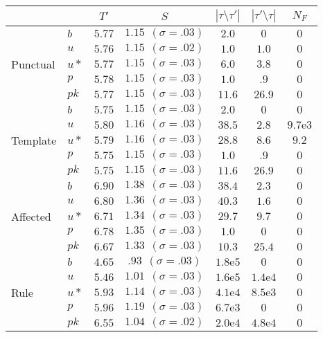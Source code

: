 \begin{tabular}{|l|l||c|c|c|c|c|}
\cline{3-7}\multicolumn{2}{l|}{} &
$T'$ & $S$ & $|\tau \setminus \tau'|$ & $|\tau' \setminus \tau|$ & $N_F$ \\ 
\hline\hline 
\multirow{5}{*}{\begin{sideways}\footnotesize Punctual \end{sideways}}
& $b$ & $5.77$ & $1.15\ \ {(\sigma=.03)}$ & $2.0$ & $0$ & $0$ \\ 
& $u$ & $5.76$ & $1.15\ \ {(\sigma=.02)}$ & $1.0$ & $1.0$ & $0$ \\ 
& $u*$ & $5.77$ & $1.15\ \ {(\sigma=.03)}$ & $6.0$ & $3.8$ & $0$ \\ 
& $p$ & $5.78$ & $1.15\ \ {(\sigma=.03)}$ & $1.0$ & $.9$ & $0$ \\ 
& $pk$ & $5.77$ & $1.15\ \ {(\sigma=.03)}$ & $11.6$ & $26.9$ & $0$ \\ 
\hline
\multirow{5}{*}{\begin{sideways}\footnotesize Template \end{sideways}}
& $b$ & $5.75$ & $1.15\ \ {(\sigma=.03)}$ & $2.0$ & $0$ & $0$ \\ 
& $u$ & $5.80$ & $1.16\ \ {(\sigma=.03)}$ & $38.5$ & $2.8$ & $9.7\mathrm{e}3$ \\ 
& $u*$ & $5.79$ & $1.16\ \ {(\sigma=.03)}$ & $28.8$ & $8.6$ & $9.2$ \\ 
& $p$ & $5.75$ & $1.15\ \ {(\sigma=.03)}$ & $1.0$ & $.9$ & $0$ \\ 
& $pk$ & $5.75$ & $1.15\ \ {(\sigma=.03)}$ & $11.6$ & $26.9$ & $0$ \\ 
\hline
\multirow{5}{*}{\begin{sideways}\footnotesize Affected \end{sideways}}
& $b$ & $6.90$ & $1.38\ \ {(\sigma=.03)}$ & $38.4$ & $2.3$ & $0$ \\ 
& $u$ & $6.80$ & $1.36\ \ {(\sigma=.03)}$ & $40.3$ & $1.6$ & $0$ \\ 
& $u*$ & $6.71$ & $1.34\ \ {(\sigma=.03)}$ & $29.7$ & $9.7$ & $0$ \\ 
& $p$ & $6.78$ & $1.35\ \ {(\sigma=.03)}$ & $1.0$ & $0$ & $0$ \\ 
& $pk$ & $6.67$ & $1.33\ \ {(\sigma=.03)}$ & $10.3$ & $25.4$ & $0$ \\ 
\hline
\multirow{5}{*}{\begin{sideways}\footnotesize Rule \end{sideways}}
& $b$ & $4.65$ & $.93\ \ {(\sigma=.03)}$ & $1.8\mathrm{e}5$ & $0$ & $0$ \\ 
& $u$ & $5.46$ & $1.01\ \ {(\sigma=.03)}$ & $1.6\mathrm{e}5$ & $1.4\mathrm{e}4$ & $0$ \\ 
& $u*$ & $5.93$ & $1.14\ \ {(\sigma=.03)}$ & $4.1\mathrm{e}4$ & $8.5\mathrm{e}3$ & $0$ \\ 
& $p$ & $5.96$ & $1.19\ \ {(\sigma=.03)}$ & $6.7\mathrm{e}3$ & $0$ & $0$ \\ 
& $pk$ & $6.55$ & $1.04\ \ {(\sigma=.02)}$ & $2.0\mathrm{e}4$ & $4.8\mathrm{e}4$ & $0$ \\ 
\hline
\end{tabular}

